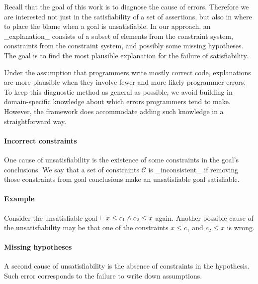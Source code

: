 Recall that the goal of this work is to diagnose the cause of errors.
Therefore we are interested not just in the satisfiability of a
set of assertions, but also in where to place the blame when
a goal is unsatisfiable. In our approach,
an _explanation_ consists of a subset of elements from the constraint
system, constraints from the constraint system, and possibly some
missing hypotheses. The goal is to find the most plausible
explanation for the failure of satisfiability. 

Under the assumption that programmers write mostly correct code,
explanations are more plausible when they involve fewer and more
likely programmer errors. To keep this diagnostic method as general as
possible, we avoid building in domain-specific knowledge about which
errors programmers tend to make. However, the framework does
accommodate adding such knowledge in a straightforward way.


\paragraph{Incorrect constraints}

One cause of unsatisfiability is the existence of some constraints
in the goal's conclusions. We say that a set of constraints
$\mathcal{C}$ is _inconsistent_ if removing those constraints from
goal conclusions make an unsatisfiable goal satisfiable.

\paragraph{Example}

Consider the unsatisfiable goal $\vdash x \leq c_1 \land c_2 \leq x$
again. Another possible cause of the unsatisfiability may be that one
of the constraints $x \leq c_1$ and $c_2 \leq x$ is wrong. 

\paragraph{Missing hypotheses}

A second cause of unsatisfiability is the absence of constraints in
the hypothesis. Such error corresponds to the failure to write down
assumptions.

